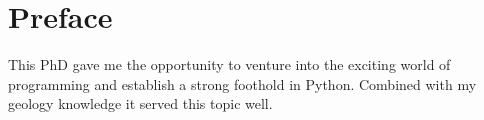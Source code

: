 \chapter*{Preface}                                  \label{ch:preface}

This PhD gave me the opportunity to venture into the exciting world of programming and establish a strong foothold in Python. %
Combined with my geology knowledge it served this topic well.

\instructionspreface


\cleardoublepage

